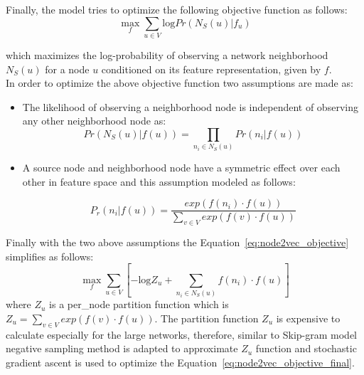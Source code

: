 \begin{itemize}
Finally, the model tries to optimize the following objective function as follows:
\begin{equation}\label{eq:node2vec_objective}
\max_{f} \sum_{u \in V } \textrm{log} Pr(N_S(u)|f_{u})
\end{equation}

which maximizes the log-probability of observing a network neighborhood $N_S(u)$ for a node $u$ conditioned on its feature representation, given by $f$.\\
In order to optimize the above objective function two assumptions are made as:
\begin{itemize}
\item The likelihood of observing a neighborhood node is independent of observing any other neighborhood node as:
\begin{equation}
 Pr(N_S(u)|f(u))= \prod_{n_i \in N_S(u)}Pr(n_i|f(u))
\end{equation}
\item A source node and neighborhood node have a symmetric effect over each other in feature space and this assumption modeled as follows:

\begin{equation}
P_{r}(n_{i}|f(u))=\frac{exp(f(n_i)\cdot f(u))}{\sum\limits_{v \in V} exp(f(v)\cdot f(u))}
\end{equation}

\end{itemize}
Finally with the two above assumptions the Equation~\ref{eq:node2vec_objective} simplifies as follows:
\begin{equation}\label{eq:node2vec_objective_final}
\max_{f} \sum_{u \in V }[ -\textrm{log}Z_u + \sum_{n_i \in N_S (u) }f(n_i) \cdot f(u)]
\end{equation}
where $Z_u$ is a per\_node partition function which is $Z_u= \sum\limits_{v \in V} exp(f(v)\cdot f(u))$. The partition function $Z_u$ is expensive to calculate especially for the large networks, therefore, similar to Skip-gram model negative sampling method is adapted to approximate $Z_u$ function and stochastic gradient ascent is used to optimize the Equation~\ref{eq:node2vec_objective_final}.\\



\end{itemize}
